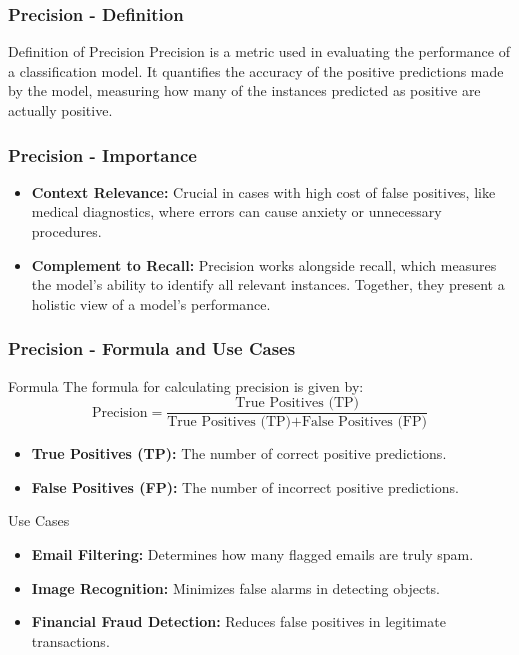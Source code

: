 \documentclass[aspectratio=169]{beamer}
\begin{document}
\begin{frame}[fragile]
    \frametitle{Precision - Definition}
    \begin{block}{Definition of Precision}
        Precision is a metric used in evaluating the performance of a classification model. It quantifies the accuracy of the positive predictions made by the model, measuring how many of the instances predicted as positive are actually positive.
    \end{block}
\end{frame}

\begin{frame}[fragile]
    \frametitle{Precision - Importance}
    \begin{itemize}
        \item \textbf{Context Relevance:} Crucial in cases with high cost of false positives, like medical diagnostics, where errors can cause anxiety or unnecessary procedures.
        
        \item \textbf{Complement to Recall:} Precision works alongside recall, which measures the model's ability to identify all relevant instances. Together, they present a holistic view of a model's performance.
    \end{itemize}
\end{frame}

\begin{frame}[fragile]
    \frametitle{Precision - Formula and Use Cases}
    \begin{block}{Formula}
        The formula for calculating precision is given by:
        \begin{equation}
            \text{Precision} = \frac{\text{True Positives (TP)}}{\text{True Positives (TP)} + \text{False Positives (FP)}}
        \end{equation}
        \begin{itemize}
            \item \textbf{True Positives (TP):} The number of correct positive predictions.
            \item \textbf{False Positives (FP):} The number of incorrect positive predictions.
        \end{itemize}
    \end{block}

    \begin{block}{Use Cases}
        \begin{itemize}
            \item \textbf{Email Filtering:} Determines how many flagged emails are truly spam.
            \item \textbf{Image Recognition:} Minimizes false alarms in detecting objects.
            \item \textbf{Financial Fraud Detection:} Reduces false positives in legitimate transactions.
        \end{itemize}
    \end{block}
\end{frame}
\end{document}
